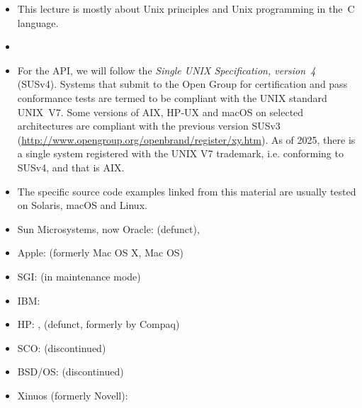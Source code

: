 \pagebreak

\begin{slide}
\end{slide}

\begin{itemize}
\item This lecture is mostly about Unix principles and Unix programming in the~C
language.
\item {}
\item For the API, we will follow the \emph{Single UNIX Specification,
version~4} (SUSv4). Systems that submit to the Open Group for certification and
pass conformance tests are termed to be compliant with the UNIX standard
UNIX~V7.  Some versions of AIX, HP-UX and macOS on selected architectures
are compliant with the previous version SUSv3
(\url{http://www.opengroup.org/openbrand/register/xy.htm}).
As of 2025, there is a single system registered with the UNIX V7 trademark, i.e.
conforming to SUSv4, and that is AIX.
\item The specific source code examples linked from this material are usually
tested on Solaris, macOS and Linux.
\end{itemize}


\begin{slide}
\end{slide}


\begin{slide}

\begin{itemize}
\item Sun Microsystems, now Oracle:  (defunct), 
\item Apple:  (formerly Mac OS X, Mac OS)
\item SGI:  (in maintenance mode)
\item IBM: 
\item HP: ,  (defunct, formerly by Compaq)
\item SCO:  (discontinued)
\item BSD/OS:  (discontinued)
\item Xinuos (formerly Novell): 
\end{itemize}
\end{slide}

